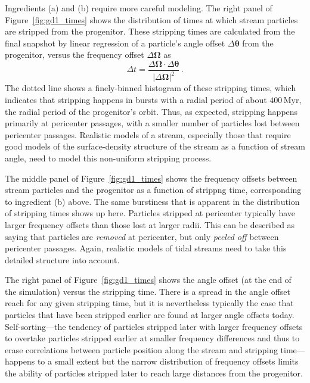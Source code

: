\documentclass[12pt,preprint]{aastex}
\renewcommand{\figurename}{Figure}
\renewcommand{\vec}[1]{\ensuremath{\mathbf{#1}}}
\newcommand{\veco}{\ensuremath{\vec{\Omega}}}
\newcommand{\veca}{\ensuremath{\boldsymbol\theta}}
\newcommand{\Myr}{\ensuremath{\,\mathrm{Myr}}}
\begin{document}
Ingredients (a) and (b) require more careful modeling. The right panel
of \figurename~\ref{fig:gd1_times} shows the distribution of times at
which stream particles are stripped from the progenitor. These
stripping times are calculated from the final snapshot by linear
regression of a particle's angle offset $\Delta \veca$ from the
progenitor, versus the frequency offset $\Delta \veco$ as 
\begin{equation}
  \Delta t = \frac{\Delta \veco \cdot \Delta \veca}{|\Delta \veco|^2}\,.
\end{equation}
The dotted line shows a finely-binned histogram of these stripping
times, which indicates that stripping happens in bursts with a radial
period of about $400\Myr$, the radial period of the progenitor's
orbit. Thus, as expected, stripping happens primarily at pericenter
passages, with a smaller number of particles lost between pericenter
passages. Realistic models of a stream, especially those that require
good models of the surface-density structure of the stream as a
function of stream angle, need to model this non-uniform stripping
process.

The middle panel of \figurename~\ref{fig:gd1_times} shows the
frequency offsets between stream particles and the progenitor as a
function of strippng time, corresponding to ingredient (b) above. The
same burstiness that is apparent in the distribution of stripping
times shows up here. Particles stripped at pericenter typically have
larger frequency offsets than those lost at larger radii. This can be
described as saying that particles are \emph{removed} at pericenter,
but only \emph{peeled off} between pericenter passages. Again,
realistic models of tidal streams need to take this detailed structure
into account.

The right panel of \figurename~\ref{fig:gd1_times} shows the angle
offset (at the end of the simulation) versus the stripping time. There
is a spread in the angle offset reach for any given stripping time,
but it is nevertheless typically the case that particles that have
been stripped earlier are found at larger angle offsets
today. Self-sorting---the tendency of particles stripped later with
larger frequency offsets to overtake particles stripped earlier at
smaller frequency differences and thus to erase correlations between
particle position along the stream and stripping time---happens to a
small extent but the narrow distribution of frequency offsets limits
the ability of particles stripped later to reach large distances from
the progenitor.
\end{document}
